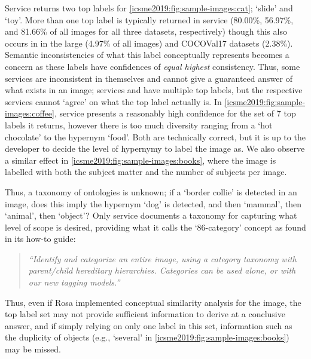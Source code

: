 Service \awsapi{} returns two top labels for \cref{icsme2019:fig:sample-images:cat}; `slide' and `toy'. More than one top label is typically returned in service \awsapi{} (80.00\%, 56.97\%, and 81.66\% of all images for all three datasets, respectively) though this also occurs in \azureapi{} in the large (4.97\% of all images) and COCOVal17 datasets (2.38\%). Semantic inconsistencies of what this label conceptually represents becomes a concern as these labels have confidences of \textit{equal highest} consistency. Thus, some services are inconsistent in themselves and cannot give a guaranteed answer of what exists in an image; services \awsapi{} and \azureapi{} have multiple top labels, but the respective services cannot `agree' on what the top label actually is. In \cref{icsme2019:fig:sample-images:coffee}, service \awsapi{} presents a reasonably high confidence for the set of 7 top labels it returns, however there is too much diversity ranging from a `hot chocolate' to the hypernym `food'. Both are technically correct, but it is up to the developer to decide the level of hypernymy to label the image as. We also observe a similar effect in \cref{icsme2019:fig:sample-images:books}, where the image is labelled with both the subject matter and the number of subjects per image.

Thus, a taxonomy of ontologies is unknown; if a `border collie' is detected in an image, does this imply the hypernym `dog' is detected, and then `mammal', then `animal', then `object'? Only service \azureapi{} documents a taxonomy for capturing what level of scope is desired, providing what it calls the `86-category' concept as found in its how-to guide:

\begin{quote}
  \itshape
  ``Identify and categorize an entire image, using a category taxonomy with parent/child hereditary hierarchies. Categories can be used alone, or with our new tagging models.'' 
  \upshape{}
\end{quote}

 Thus, even if Rosa implemented conceptual similarity analysis for the image, the top label set may not provide sufficient information to derive at a conclusive answer, and if simply relying on only one label in this set, information such as the duplicity of objects (e.g., `several' in \cref{icsme2019:fig:sample-images:books}) may be missed.


